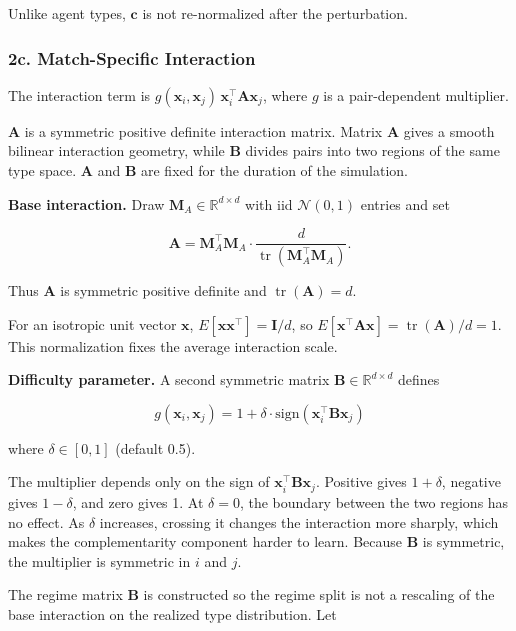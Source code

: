 \documentclass[11pt]{article}
\begin{document}
Unlike agent types, \(\mathbf c\) is not re-normalized after the perturbation.

\subsubsection{2c. Match-Specific Interaction}\label{c.-match-specific-interaction}

The interaction term is \(g(\mathbf{x}_i,\mathbf{x}_j)\,\mathbf{x}_i^\top\mathbf{A}\mathbf{x}_j\), where \(g\) is a pair-dependent multiplier.

\(\mathbf{A}\) is a symmetric positive definite interaction matrix. Matrix \(\mathbf{A}\) gives a smooth bilinear interaction geometry, while \(\mathbf{B}\) divides pairs into two regions of the same type space. \(\mathbf{A}\) and \(\mathbf{B}\) are fixed for the duration of the simulation.

\textbf{Base interaction.} Draw \(\mathbf{M}_A\in\mathbb{R}^{d\times d}\) with iid \(\mathcal{N}(0,1)\) entries and set

\[
\mathbf{A}=\mathbf{M}_A^\top\mathbf{M}_A\cdot\frac{d}{\operatorname{tr}(\mathbf{M}_A^\top\mathbf{M}_A)}.
\]

Thus \(\mathbf{A}\) is symmetric positive definite and \(\operatorname{tr}(\mathbf{A})=d\).

For an isotropic unit vector \(\mathbf{x}\), \(E[\mathbf{x}\mathbf{x}^\top]=\mathbf{I}/d\), so \(E[\mathbf{x}^\top\mathbf{A}\mathbf{x}]=\operatorname{tr}(\mathbf{A})/d=1\). This normalization fixes the average interaction scale.

\textbf{Difficulty parameter.} A second symmetric matrix \(\mathbf{B}\in\mathbb{R}^{d\times d}\) defines

\[g(\mathbf{x}_i, \mathbf{x}_j) = 1 + \delta \cdot \text{sign}(\mathbf{x}_i^\top \mathbf{B} \mathbf{x}_j)\]

where \(\delta\in[0,1]\) (default 0.5).

The multiplier depends only on the sign of \(\mathbf{x}_i^\top\mathbf{B}\mathbf{x}_j\). Positive gives \(1+\delta\), negative gives \(1-\delta\), and zero gives 1. At \(\delta=0\), the boundary between the two regions has no effect. As \(\delta\) increases, crossing it changes the interaction more sharply, which makes the complementarity component harder to learn. Because \(\mathbf{B}\) is symmetric, the multiplier is symmetric in \(i\) and \(j\).

The regime matrix \(\mathbf{B}\) is constructed so the regime split is not a rescaling of the base interaction on the realized type distribution. Let
\end{document}
